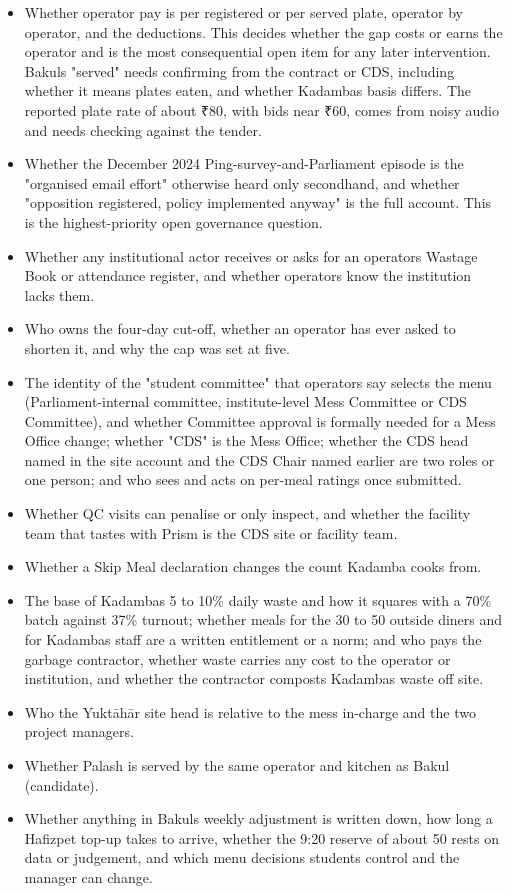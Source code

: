 \documentclass[
  10pt,
  table]{article}
\providecommand{\tightlist}{%
  \setlength{\itemsep}{0pt}\setlength{\parskip}{0pt}}
\renewcommand{\tightlist}{\setlength{\itemsep}{1.5pt}\setlength{\parskip}{0pt}}
\begin{document}
\begin{itemize}
\tightlist
\item
  Whether operator pay is per registered or per served plate, operator by operator, and the deductions. This decides whether the gap costs or earns the operator and is the most consequential open item for any later intervention. Bakul\textquotesingle s "served" needs confirming from the contract or CDS, including whether it means plates eaten, and whether Kadamba\textquotesingle s basis differs. The reported plate rate of about ₹80, with bids near ₹60, comes from noisy audio and needs checking against the tender.
\item
  Whether the December 2024 Ping-survey-and-Parliament episode is the "organised email effort" otherwise heard only secondhand, and whether "opposition registered, policy implemented anyway" is the full account. This is the highest-priority open governance question.
\item
  Whether any institutional actor receives or asks for an operator\textquotesingle s Wastage Book or attendance register, and whether operators know the institution lacks them.
\item
  Who owns the four-day cut-off, whether an operator has ever asked to shorten it, and why the cap was set at five.
\item
  The identity of the "student committee" that operators say selects the menu (Parliament-internal committee, institute-level Mess Committee or CDS Committee), and whether Committee approval is formally needed for a Mess Office change; whether "CDS" is the Mess Office; whether the CDS head named in the site account and the CDS Chair named earlier are two roles or one person; and who sees and acts on per-meal ratings once submitted.
\item
  Whether QC visits can penalise or only inspect, and whether the facility team that tastes with Prism is the CDS site or facility team.
\item
  Whether a Skip Meal declaration changes the count Kadamba cooks from.
\item
  The base of Kadamba\textquotesingle s 5 to 10\% daily waste and how it squares with a 70\% batch against 37\% turnout; whether meals for the 30 to 50 outside diners and for Kadamba\textquotesingle s staff are a written entitlement or a norm; and who pays the garbage contractor, whether waste carries any cost to the operator or institution, and whether the contractor composts Kadamba\textquotesingle s waste off site.
\item
  Who the Yuktāhār site head is relative to the mess in-charge and the two project managers.
\item
  Whether Palash is served by the same operator and kitchen as Bakul (candidate).
\item
  Whether anything in Bakul\textquotesingle s weekly adjustment is written down, how long a Hafizpet top-up takes to arrive, whether the 9:20 reserve of about 50 rests on data or judgement, and which menu decisions students control and the manager can change.
\end{itemize}
\end{document}
